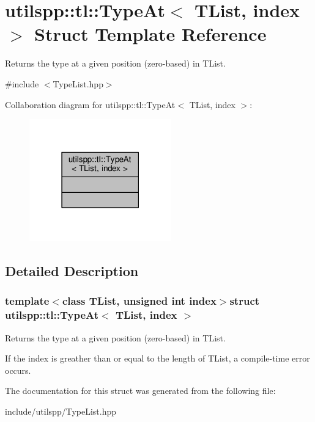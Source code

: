 \hypertarget{structutilspp_1_1tl_1_1TypeAt}{\section{utilspp\-:\-:tl\-:\-:Type\-At$<$ T\-List, index $>$ Struct Template Reference}
\label{structutilspp_1_1tl_1_1TypeAt}
}


Returns the type at a given position (zero-\/based) in T\-List.  




{\ttfamily \#include $<$Type\-List.\-hpp$>$}



Collaboration diagram for utilspp\-:\-:tl\-:\-:Type\-At$<$ T\-List, index $>$\-:\nopagebreak
\begin{figure}[H]
\begin{center}
\leavevmode
\includegraphics[width=174pt]{structutilspp_1_1tl_1_1TypeAt__coll__graph}
\end{center}
\end{figure}


\subsection{Detailed Description}
\subsubsection*{template$<$class T\-List, unsigned int index$>$struct utilspp\-::tl\-::\-Type\-At$<$ T\-List, index $>$}

Returns the type at a given position (zero-\/based) in T\-List. 

If the index is greather than or equal to the length of T\-List, a compile-\/time error occurs. 

The documentation for this struct was generated from the following file\-:\begin{DoxyCompactItemize}
\item 
include/utilspp/Type\-List.\-hpp\end{DoxyCompactItemize}
